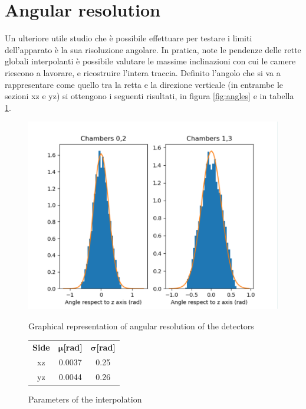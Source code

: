 \documentclass[a4paper,11pt]{book}
\begin{document}
\section{Angular resolution}

Un ulteriore utile studio che è possibile effettuare per testare i limiti dell'apparato è la sua risoluzione angolare. In pratica, note le pendenze delle rette globali interpolanti è possibile valutare le massime inclinazioni con cui le camere riescono a lavorare, e ricostruire l'intera traccia. Definito l'angolo che si va a rappresentare come quello tra la retta e la direzione verticale (in entrambe le sezioni xz e yz) si ottengono i seguenti risultati, in figura \ref{fig:angles} e in tabella \ref{tab:angles}. \\
\begin{figure}[hbtp]
\begin{minipage}[c]{0.6\textwidth}
\centering
\includegraphics[scale=0.6]{pictures/Angles.pdf}
\caption{Graphical representation of angular resolution of the detectors}
\label{fig:angles}
\end{minipage} \quad
\begin{minipage}[c]{0.4\textwidth}
\begin{tabular}{c | c  c}
\toprule
 \textbf{Side} & $\bm{\mu}$\textbf{[rad]} & $\bm{\sigma}$\textbf{[rad]}\\
xz & 0.0037 & 0.25\\
yz & 0.0044 & 0.26\\
\bottomrule
\end{tabular}
\caption{Parameters of the interpolation}
\label{tab:angles}
\end{minipage}
\end{figure}
\end{document}
